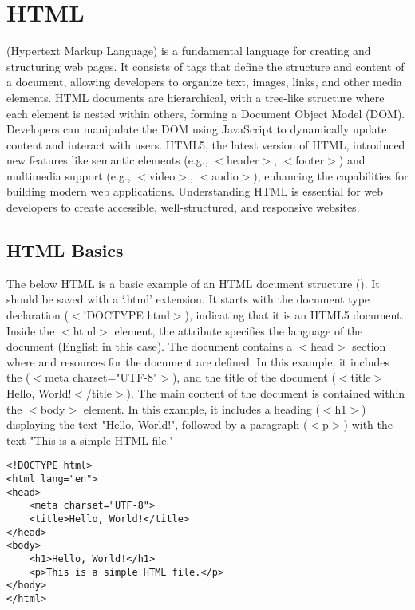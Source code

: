 \chapter{HTML}
\thispagestyle{fancy}
\lstset{}\lstset{language=html, style=htmlstyle}

 (Hypertext Markup Language) is a fundamental language for creating and structuring web pages. It consists of tags that define the structure and content of a document, allowing developers to organize text, images, links, and other media elements. HTML documents are hierarchical, with a tree-like structure where each element is nested within others, forming a Document Object Model (DOM). Developers can manipulate the DOM using JavaScript to dynamically update content and interact with users. HTML5, the latest version of HTML, introduced new features like semantic elements (e.g., $<$header$>$, $<$footer$>$) and multimedia support (e.g., $<$video$>$, $<$audio$>$), enhancing the capabilities for building modern web applications. Understanding HTML is essential for web developers to create accessible, well-structured, and responsive websites.











\section{HTML Basics}

The below HTML is a basic example of an HTML document structure (). It should be saved with a `.html' extension. It starts with the document type declaration ($<$!DOCTYPE html$>$), indicating that it is an HTML5 document. Inside the $<$html$>$ element, the  attribute specifies the language of the document (English in this case). The document contains a $<$head$>$ section where  and resources for the document are defined. In this example, it includes the  ($<$meta charset="UTF-8"$>$), and the title of the document ($<$title$>$Hello, World!$<$/title$>$). The main content of the document is contained within the $<$body$>$ element. In this example, it includes a heading ($<$h1$>$) displaying the text "Hello, World!", followed by a paragraph ($<$p$>$) with the text "This is a simple HTML file."

\begin{lstlisting}
<!DOCTYPE html>
<html lang="en">
<head>
    <meta charset="UTF-8">
    <title>Hello, World!</title>
</head>
<body>
    <h1>Hello, World!</h1>
    <p>This is a simple HTML file.</p>
</body>
</html>
\end{lstlisting}

